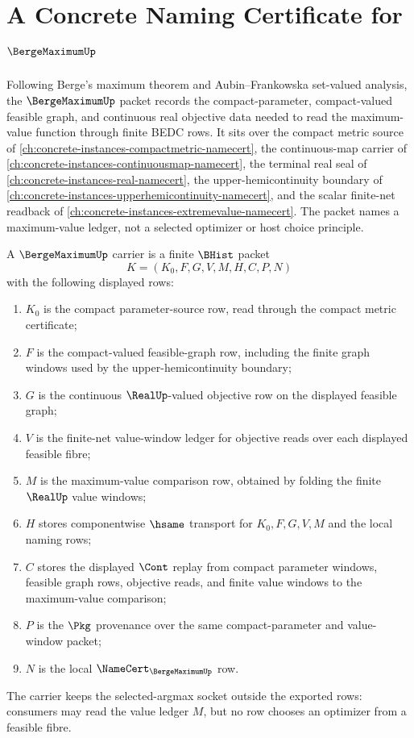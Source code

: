 \chapter{A Concrete Naming Certificate for $\BergeMaximumUp$}
\label{ch:concrete-instances-berge-maximum-namecert}

Following Berge's maximum theorem and Aubin--Frankowska set-valued analysis, the $\BergeMaximumUp$ packet records the compact-parameter, compact-valued feasible graph, and continuous real objective data needed to read the maximum-value function through finite BEDC rows. It sits over the compact metric source of \autoref{ch:concrete-instances-compactmetric-namecert}, the continuous-map carrier of \autoref{ch:concrete-instances-continuousmap-namecert}, the terminal real seal of \autoref{ch:concrete-instances-real-namecert}, the upper-hemicontinuity boundary of \autoref{ch:concrete-instances-upperhemicontinuity-namecert}, and the scalar finite-net readback of \autoref{ch:concrete-instances-extremevalue-namecert}. The packet names a maximum-value ledger, not a selected optimizer or host choice principle.

\begin{definition}
\label{def:berge-maximum-carrier}
A $\BergeMaximumUp$ carrier is a finite $\BHist$ packet
$$
K=(K_0,F,G,V,M,H,C,P,N)
$$
with the following displayed rows:
\begin{enumerate}
\item $K_0$ is the compact parameter-source row, read through the compact metric certificate;
\item $F$ is the compact-valued feasible-graph row, including the finite graph windows used by the upper-hemicontinuity boundary;
\item $G$ is the continuous $\RealUp$-valued objective row on the displayed feasible graph;
\item $V$ is the finite-net value-window ledger for objective reads over each displayed feasible fibre;
\item $M$ is the maximum-value comparison row, obtained by folding the finite $\RealUp$ value windows;
\item $H$ stores componentwise $\hsame$ transport for $K_0,F,G,V,M$ and the local naming rows;
\item $C$ stores the displayed $\Cont$ replay from compact parameter windows, feasible graph rows, objective reads, and finite value windows to the maximum-value comparison;
\item $P$ is the $\Pkg$ provenance over the same compact-parameter and value-window packet;
\item $N$ is the local $\NameCert_{\BergeMaximumUp}$ row.
\end{enumerate}
The carrier keeps the selected-argmax socket outside the exported rows: consumers may read the value ledger $M$, but no row chooses an optimizer from a feasible fibre.
\end{definition}

